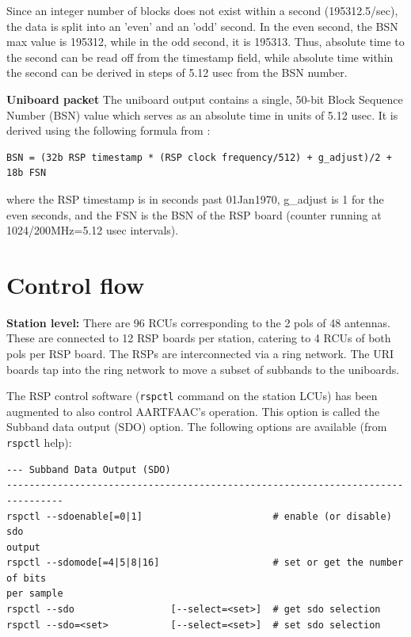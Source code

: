 \documentclass {article}
\begin{document}
Since  an   integer  number  of  blocks   does  not  exist  within   a  second
(195312.5/sec), the data is  split into an 'even' and an  'odd' second. In the
even second,  the BSN  max value  is 195312, while  in the  odd second,  it is
195313. Thus, absolute time  to the second can be read  off from the timestamp
field, while absolute time  within the second can be derived  in steps of 5.12
usec from the BSN number. 

\textbf  {Uniboard  packet} The  uniboard output  contains a
single, 50-bit  Block Sequence  Number (BSN) value  which serves as  an absolute
time in units of 5.12 usec. It is derived using the following formula from \cite{RP-1402}:
\begin{lstlisting}
BSN = (32b RSP timestamp * (RSP clock frequency/512) + g_adjust)/2 + 18b FSN
\end{lstlisting}
where the RSP timestamp is in seconds past 01Jan1970, g\_adjust is 1 for the even
seconds,  and  the  FSN  is  the  BSN  of the  RSP  board  (counter  running  at
1024/200MHz=5.12 usec intervals).



\section {Control flow}
\textbf {Station  level:} There are  96 RCUs corresponding  to the 2 pols  of 48
antennas. These are  connected to 12 RSP boards per station,  catering to 4 RCUs
of both pols per RSP board.  The RSPs are interconnected via a ring network. The
URI  boards tap  into the  ring network  to  move a  subset of  subbands to  the
uniboards.

The RSP control software (\verb+rspctl+ command  on the station LCUs) has been
augmented  to also  control AARTFAAC's  operation. This  option is  called the
Subband data output  (SDO) option.  The following options  are available (from
\verb+rspctl+ help):
\begin{verbatim}
--- Subband Data Output (SDO)
--------------------------------------------------------------------------------
rspctl --sdoenable[=0|1]                       # enable (or disable) sdo
output
rspctl --sdomode[=4|5|8|16]                    # set or get the number of bits
per sample
rspctl --sdo                 [--select=<set>]  # get sdo selection
rspctl --sdo=<set>           [--select=<set>]  # set sdo selection
\end{verbatim}
\end{document}
